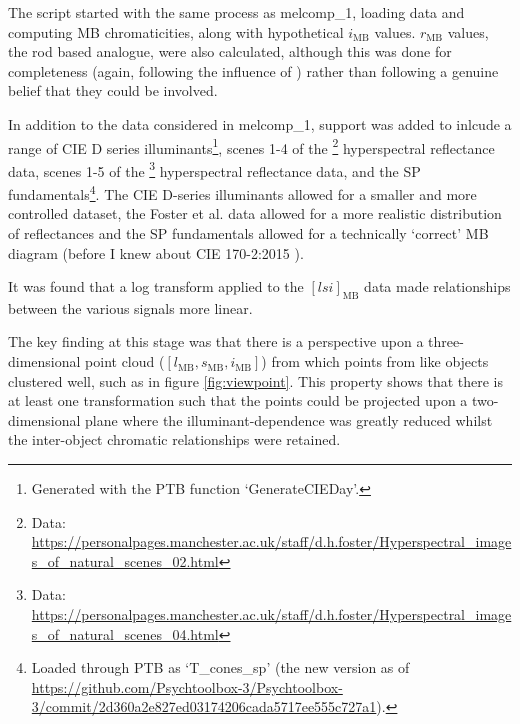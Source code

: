 The script started with the same process as melcomp\_1, loading data and computing \gls{MB} chromaticities, along with hypothetical $i_{\text{MB}}$ values. $r_{\text{MB}}$ values, the rod based analogue, were also calculated, although this was done for completeness (again, following the influence of \cite{barrionuevo_contributions_2014}) rather than following a genuine belief that they could be involved.

In addition to the data considered in melcomp\_1, support was added to inlcude a range of CIE D series illuminants\footnote{Generated with the \gls{PTB} function `GenerateCIEDay'.}, scenes 1-4 of the
\citet{nascimento_statistics_2002}\footnote{Data: \url{https://personalpages.manchester.ac.uk/staff/d.h.foster/Hyperspectral_images_of_natural_scenes_02.html}} hyperspectral reflectance data,
scenes 1-5 of the 
\citet{foster_frequency_2006}\footnote{Data: \url{https://personalpages.manchester.ac.uk/staff/d.h.foster/Hyperspectral_images_of_natural_scenes_04.html}}
hyperspectral reflectance data, and the \gls{SP} fundamentals\footnote{Loaded through \gls{PTB} as `T\_cones\_sp' (the new version as of \url{https://github.com/Psychtoolbox-3/Psychtoolbox-3/commit/2d360a2e827ed03174206cada5717ee555c727a1}).}. The CIE D-series illuminants allowed for a smaller and more controlled dataset, the Foster et al. data allowed for a more realistic distribution of reflectances and the \acrfull{SP} fundamentals allowed for a technically `correct' \gls{MB} diagram (before I knew about CIE 170-2:2015 \cite{cie_cie_2015}).

It was found that a log transform applied to the $[lsi]_{\text{MB}}$ data made relationships between the various signals more linear.

The key finding at this stage was that there is a perspective upon a three-dimensional point cloud ($[l_{\text{MB}},s_{\text{MB}},i_{\text{MB}}]$) from which points from like objects clustered well, such as in figure \ref{fig:viewpoint}. This property shows that there is at least one transformation such that the points could be projected upon a two-dimensional plane where the illuminant-dependence was greatly reduced whilst the inter-object chromatic relationships were retained. 

